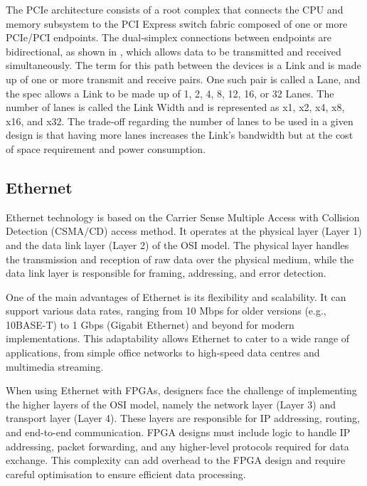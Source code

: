 The PCIe architecture consists of a root complex that connects the CPU and memory subsystem to the PCI Express switch fabric composed of one or more PCIe/PCI endpoints. The dual‐simplex connections between endpoints are bidirectional, as shown in , which allows data to be transmitted and received simultaneously. The term for this path between the devices is a Link and is made up of one or
more transmit and receive pairs. One such pair is called a Lane, and the spec
allows a Link to be made up of 1, 2, 4, 8, 12, 16, or 32 Lanes. The number of lanes is
called the Link Width and is represented as x1, x2, x4, x8, x16, and x32. The trade‐off regarding the number of lanes to be used in a given design is that having more lanes increases the Link's bandwidth but at the cost of space requirement and power consumption.









\subsection{Ethernet}
Ethernet technology\cite{Ethernet} is based on the Carrier Sense Multiple Access with Collision Detection (CSMA/CD) access method. It operates at the physical layer (Layer 1) and the data link layer (Layer 2) of the OSI model. The physical layer handles the transmission and reception of raw data over the physical medium, while the data link layer is responsible for framing, addressing, and error detection.

One of the main advantages of Ethernet is its flexibility and scalability. It can support various data rates, ranging from 10 Mbps for older versions (e.g., 10BASE-T) to 1 Gbps (Gigabit Ethernet) and beyond for modern implementations. This adaptability allows Ethernet to cater to a wide range of applications, from simple office networks to high-speed data centres and multimedia streaming.

When using Ethernet with FPGAs, designers face the challenge of implementing the higher layers of the OSI model, namely the network layer (Layer 3) and transport layer (Layer 4). These layers are responsible for IP addressing, routing, and end-to-end communication. FPGA designs must include logic to handle IP addressing, packet forwarding, and any higher-level protocols required for data exchange. This complexity can add overhead to the FPGA design and require careful optimisation to ensure efficient data processing.

